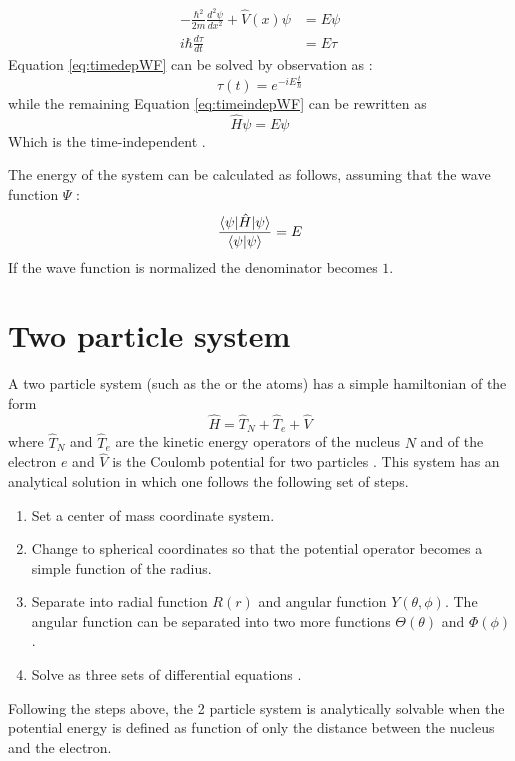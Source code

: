 \documentclass[../master_thesis.tex]{subfiles}
\begin{document}
\begin{subequations}
  \label{eq:sysSE}
  \begin{align}
    -\frac{\hbar^2}{2m}\frac{d^2\psi}{d x^2} + \hat{V}(x)\psi &= E\psi  \label{eq:timeindepWF}\\
    i\hbar\frac{d\tau}{d t} &= E\tau  \label{eq:timedepWF}
  \end{align}
\end{subequations}
Equation \ref{eq:timedepWF} can be solved by observation as \cite{Atkins:2011, Cohen:1973} :
\begin{equation}
  \tau(t) = e^{-iE\frac{t}{\hbar}}
\end{equation}
while the remaining Equation \ref{eq:timeindepWF} can be rewritten as
\begin{equation}
  \hat{H}\psi = E\psi\label{eq:timeindepSE}
\end{equation}
Which is the time-independent \SE.

The energy of the system can be calculated as follows, assuming that the wave
function $\Psi$ \cite{Cramer:2004}:
\begin{equation}\label{eq:endevaleq}
  \frac{\braket{\psi|\hat{H}|\psi}}{\braket{\psi|\psi}} = E
\end{equation}
If the wave function is normalized the denominator becomes $1$.

\section{Two particle system}
A two particle system (such as the  or the  atoms) has a simple
hamiltonian of the form
\begin{equation}
  \hat{H}=\hat{T}_{N}+\hat{T}_{e}+\hat{V}
\end{equation}
where $\hat{T}_N$ and $\hat{T}_e$ are the kinetic energy operators of the nucleus $N$ and
of the electron $e$ and $\hat{V}$ is the Coulomb potential for two particles
\cite{Atkins:2014, Jensen:2017}.
This system has an analytical solution in which one follows the following set
of steps.
\begin{enumerate}
  \item Set a center of mass coordinate system.
  \item Change to spherical coordinates so that the potential operator becomes a
  simple function of the radius.
  \item Separate into radial function $R(r)$ and angular function
  $Y(\theta, \phi)$. The angular function can be separated into two more
  functions $\Theta(\theta)$ and $\Phi(\phi)$.
  \item Solve as three sets of differential equations \cite{Simons:2016}.
\end{enumerate}
Following the steps above, the 2 particle system is analytically solvable when
the potential energy is defined as function of only the distance between the
nucleus and the electron.
\end{document}
